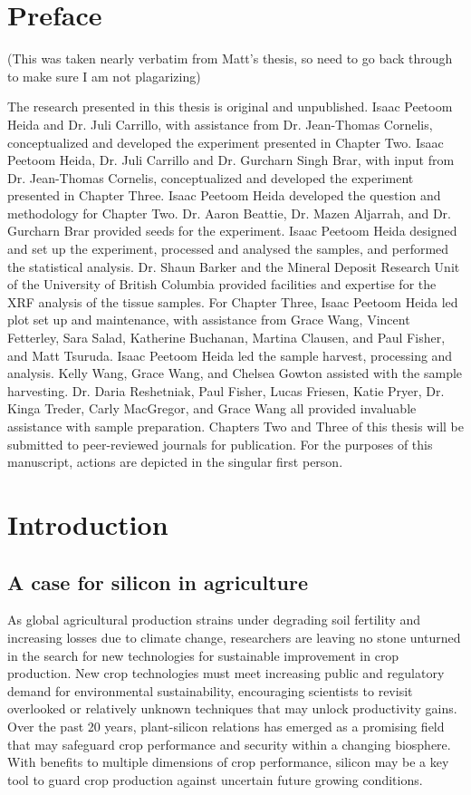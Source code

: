 \documentclass[12pt, letterpaper, ]{report}
\begin{document}
\chapter{Preface}

(This was taken nearly verbatim from Matt's thesis, so need to go back through to make sure I am not plagarizing)

The research presented in this thesis is original and unpublished. Isaac Peetoom Heida and Dr. Juli Carrillo, with assistance from Dr. Jean-Thomas Cornelis, conceptualized and developed the experiment presented in Chapter Two. Isaac Peetoom Heida, Dr. Juli Carrillo and Dr. Gurcharn Singh Brar, with input from Dr. Jean-Thomas Cornelis, conceptualized and developed the experiment presented in Chapter Three.
Isaac Peetoom Heida developed the question and methodology for Chapter Two. Dr. Aaron Beattie, Dr. Mazen Aljarrah, and Dr. Gurcharn Brar provided seeds for the experiment. Isaac Peetoom Heida designed and set up the experiment, processed and analysed the samples, and performed the statistical analysis. Dr. Shaun Barker and the Mineral Deposit Research Unit of the University of British Columbia provided facilities and expertise for the XRF analysis of the tissue samples.
For Chapter Three, Isaac Peetoom Heida led plot set up and maintenance, with assistance from Grace Wang, Vincent Fetterley, Sara Salad, Katherine Buchanan, Martina Clausen, and Paul Fisher, and Matt Tsuruda. Isaac Peetoom Heida led the sample harvest, processing and analysis. Kelly Wang, Grace Wang, and Chelsea Gowton assisted with the sample harvesting. Dr. Daria Reshetniak, Paul Fisher, Lucas Friesen, Katie Pryer, Dr. Kinga Treder, Carly MacGregor, and Grace Wang all provided invaluable assistance with sample preparation. 
Chapters Two and Three of this thesis will be submitted to peer-reviewed journals for publication. For the purposes of this manuscript, actions are depicted in the singular first person. 

\chapter{Introduction}


\section{A case for silicon in agriculture}

As global agricultural production strains under degrading soil fertility and increasing losses due to climate change, researchers are leaving no stone unturned in the search for new technologies for sustainable improvement in crop production. New crop technologies must meet increasing public and regulatory demand for environmental sustainability, encouraging scientists to revisit overlooked or relatively unknown techniques that may unlock productivity gains. Over the past 20 years, plant-silicon relations has emerged as a promising field that may safeguard crop performance and security within a changing biosphere. With benefits to multiple dimensions of crop performance, silicon may be a key tool to guard crop production against uncertain future growing conditions. 
\end{document}
